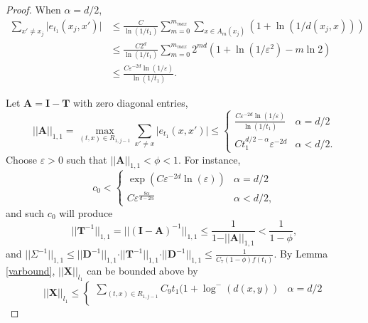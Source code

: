 \documentclass[12pt]{amsart}
\numberwithin{equation}{section}
\newcommand{\1}{\mathbf{1}}
\begin{document}
\begin{proof}
When $\alpha=d/2$,
\begin{equation*}
    \begin{split}
        \sum_{x'\neq x_j}\vert e_{t_1}(x_j,x')\vert&\leq \frac{C}{\ln(1/t_1)}\sum_{m=0}^{m_{max}}\sum_{x\in A_m(x_j)}(1+\ln(1/d(x_j,x)))\\
        &\leq \frac{C2^d}{\ln(1/t_1)}\sum_{m=0}^{m_{max}}2^{md}\left(1+\ln(1/\varepsilon^2)-m\ln 2\right)\\
        &\leq \frac{C\varepsilon^{-2d}\ln(1/\varepsilon)}{\ln(1/t_1)}.
    \end{split}
\end{equation*}

Let $\textbf{A}=\textbf{I}-\textbf{T}$ with zero diagonal entries, 
\begin{equation}
\label{matrixA}
\vert\vert\textbf{A}\vert\vert_{1,1}=\max_{(t,x)\in R_{1,j-1}}\sum_{x'\neq x}\vert e_{t_1}(x,x')\vert\leq\begin{cases}
\frac{C\varepsilon^{-2d}\ln(1/\varepsilon)}{\ln(1/t_1)} & \alpha=d/2\\
    Ct_1^{d/2-\alpha}\varepsilon^{-2d} & \alpha<d/2.
\end{cases}
\end{equation}
Choose $\varepsilon>0$ such that $\vert\vert\textbf{A}\vert\vert_{1,1}<\phi<1$. For instance,
\begin{equation}
\label{selectc0}
c_0<\begin{cases}
\exp\left(C\varepsilon^{-2d}\ln(\varepsilon)\right)&\alpha=d/2\\
C\varepsilon^{\frac{8\alpha}{d-2\alpha}}&\alpha<d/2,
\end{cases}
\end{equation}
and such $c_0$ will produce
\begin{equation*}
\vert\vert\textbf{T}^{-1}\vert\vert_{1,1}=\vert\vert(\textbf{I}-\textbf{A})^{-1}\vert\vert_{1,1}\leq \frac{1}{1-\vert\vert\textbf{A}\vert\vert_{1,1}}<\frac{1}{1-\phi},
\end{equation*}
and $\vert\vert\Sigma^{-1}\vert\vert_{1,1}\leq \vert\vert\textbf{D}^{-1}\vert\vert_{1,1}\cdot\vert\vert\textbf{T}^{-1}\vert\vert_{1,1}\cdot\vert\vert\textbf{D}^{-1}\vert\vert_{1,1}\leq \frac{1}{C_7(1-\phi)f(t_1)}$. By Lemma \eqref{varbound}, $\vert\vert\textbf{X}\vert\vert_{l_1}$ can be bounded above by
\begin{equation*}
\vert\vert\textbf{X}\vert\vert_{l_1}\leq\begin{cases}
    \sum\limits_{(t,x)\in R_{1,j-1}}C_9t_1(1+\log^-(d(x,y)) & \alpha=d/2\\

\end{cases}
\end{equation*}
\end{proof}
\end{document}
